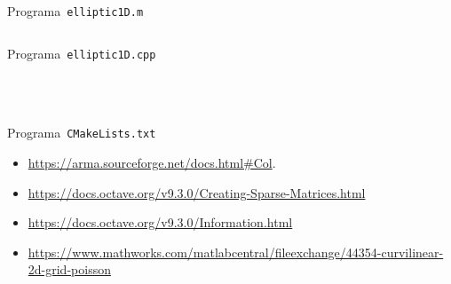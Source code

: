 \begin{problem}
\begin{listing}[ht!]
    \tiny
    \centering
    \inputminted[frame=single,framesep=10pt,linenos,firstline=1,lastline=51,highlightlines={21,29}]{octave}{../examples/octave/elliptic1D.m}
    \caption{Programa~\texttt{elliptic1D.m}}
    \label{code:elliptic1D.m}
\end{listing}

\begin{listing}[ht!]
    \tiny
    \centering
    \inputminted[frame=single,framesep=10pt,linenos,firstline=1,lastline=63,highlightlines={23,26}]{cpp}{../examples/cpp/elliptic1D.cpp}
    \caption{Programa~\texttt{elliptic1D.cpp}}
\end{listing}

\begin{listing}[ht!]
    \tiny
    \centering
    \inputminted[firstline=1,lastline=8,highlightlines={7}]{cmake}{../examples/cpp/CMakeLists.txt}
    \inputminted[firstline=14,lastline=14]{cmake}{../examples/cpp/CMakeLists.txt}
    \inputminted[firstline=16,lastline=16,highlightlines={16}]{cmake}{../examples/cpp/CMakeLists.txt}
    \inputminted[firstline=65,lastline=69]{cmake}{../examples/cpp/CMakeLists.txt}
    \caption{Programa~\texttt{CMakeLists.txt}}
\end{listing}

\begin{itemize}
    \item

          \url{https://arma.sourceforge.net/docs.html#Col}.

    \item

          \url{https://docs.octave.org/v9.3.0/Creating-Sparse-Matrices.html}

    \item

          \url{https://docs.octave.org/v9.3.0/Information.html}

    \item

          \url{https://www.mathworks.com/matlabcentral/fileexchange/44354-curvilinear-2d-grid-poisson}
\end{itemize}


\end{problem}
